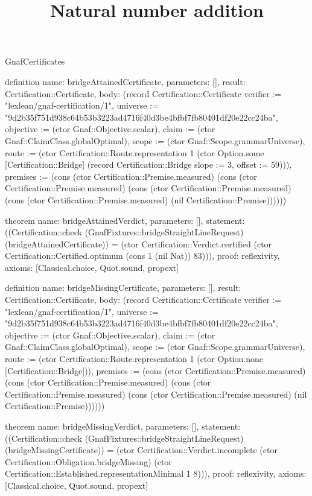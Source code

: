 \begin{lexlean}{GnafCertificates}
\title{Natural number addition}
\begin{semanticmodule}
definition{
  name: bridgeAttainedCertificate,
  parameters: [],
  result: Certification::Certificate,
  body: (record Certification::Certificate {verifier := "lexlean/gnaf-certification/1", universe := "9d2b35f751d938c64b53b3223ad4716f40d3be4bfbf7fb80401df20e22cc24ba", objective := (ctor Gnaf::Objective.scalar), claim := (ctor Gnaf::ClaimClass.globalOptimal), scope := (ctor Gnaf::Scope.grammarUniverse), route := (ctor Certification::Route.representation 1 (ctor Option.some [Certification::Bridge] (record Certification::Bridge {slope := 3, offset := 59}))), premises := (cons (ctor Certification::Premise.measured) (cons (ctor Certification::Premise.measured) (cons (ctor Certification::Premise.measured) (cons (ctor Certification::Premise.measured) (nil Certification::Premise)))))})
}

theorem{
  name: bridgeAttainedVerdict,
  parameters: [],
  statement: ((Certification::check (GnafFixtures::bridgeStraightLineRequest) (bridgeAttainedCertificate)) = (ctor Certification::Verdict.certified (ctor Certification::Certified.optimum (cons 1 (nil Nat)) 83))),
  proof: reflexivity{},
  axioms: [Classical.choice, Quot.sound, propext]
}

definition{
  name: bridgeMissingCertificate,
  parameters: [],
  result: Certification::Certificate,
  body: (record Certification::Certificate {verifier := "lexlean/gnaf-certification/1", universe := "9d2b35f751d938c64b53b3223ad4716f40d3be4bfbf7fb80401df20e22cc24ba", objective := (ctor Gnaf::Objective.scalar), claim := (ctor Gnaf::ClaimClass.globalOptimal), scope := (ctor Gnaf::Scope.grammarUniverse), route := (ctor Certification::Route.representation 1 (ctor Option.none [Certification::Bridge])), premises := (cons (ctor Certification::Premise.measured) (cons (ctor Certification::Premise.measured) (cons (ctor Certification::Premise.measured) (cons (ctor Certification::Premise.measured) (nil Certification::Premise)))))})
}

theorem{
  name: bridgeMissingVerdict,
  parameters: [],
  statement: ((Certification::check (GnafFixtures::bridgeStraightLineRequest) (bridgeMissingCertificate)) = (ctor Certification::Verdict.incomplete (ctor Certification::Obligation.bridgeMissing) (ctor Certification::Established.representationMinimal 1 8))),
  proof: reflexivity{},
  axioms: [Classical.choice, Quot.sound, propext]
}


\end{semanticmodule}
\end{lexlean}
